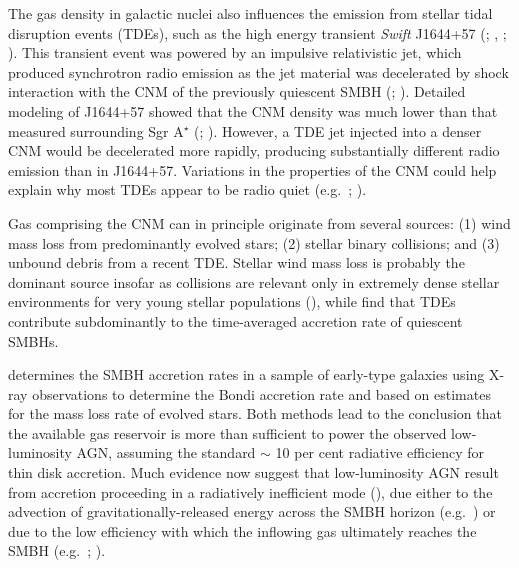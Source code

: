 \documentclass[usenatbib,fleqn]{mn2e}
\newcommand{\Mbh}[1][]{M_{\bullet#1}}
\begin{document}

The gas density in galactic nuclei also influences the emission from
stellar tidal disruption events (TDEs), such as the high energy
transient {\it Swift} J1644+57 (\citealt{Levan+11};
\citealt{Bloom+11}, \citealt{Burrows+11}; \citealt{Zauderer+11}).
This transient event was powered by an impulsive relativistic jet,
which produced synchrotron radio emission as the jet material was
decelerated by shock interaction with the CNM of the previously
quiescent SMBH (\citealt{Giannios&Metzger11}; \citealt{Zauderer+11}).
Detailed modeling of J1644+57 showed that the CNM density was much
lower than that measured surrounding Sgr A$^{\star}$
(\citealt{Metzger+12}; \citealt{BergerZauderer+:2012a}).  However, a TDE jet
injected into a denser CNM would be decelerated more rapidly,
producing substantially different radio emission than in J1644+57.
Variations in the properties of the CNM could help explain why most
TDEs appear to be radio quiet (e.g.~\citealt{Bower+13};
\citealt{VanVelzen+13}).

Gas comprising the CNM can in principle originate from several
sources: (1) wind mass loss from predominantly evolved stars; (2)
stellar binary collisions; and (3) unbound debris from a recent TDE.
Stellar wind mass loss is probably the dominant source insofar as
collisions are relevant only in extremely dense stellar environments
for very young stellar populations (\citealt{Rubin&Loeb11}), while
\citet{MacLeod+13} find that TDEs contribute subdominantly to the
time-averaged accretion rate of quiescent SMBHs.

\citet{Ho:2009a} determines the SMBH accretion rates in a sample of
early-type galaxies using X-ray observations to determine the
Bondi accretion rate and based on estimates for the mass loss rate of
evolved stars.  Both methods lead to the conclusion that the available
gas reservoir is more than sufficient to power the observed
low-luminosity AGN, assuming the standard $\sim$ 10 per cent radiative
efficiency for thin disk accretion.  Much
evidence now suggest that low-luminosity AGN result from accretion
proceeding in a radiatively inefficient mode
(\citealt{Yuan&Narayan14}), due either to the advection of
gravitationally-released energy across the SMBH horizon
(e.g.~\citealt{Narayan&Yi95}) or due to the low efficiency with which the inflowing gas ultimately reaches the SMBH
(e.g.~\citealt{Blandford&Begelman99}; \citealt{Li+13}).
\end{document}
